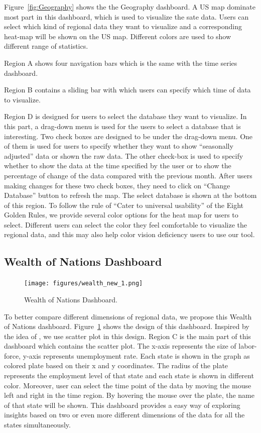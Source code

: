 \documentclass{sigchi}
\begin{document}
Figure~\ref{fig:Geography} shows the the Geography dashboard. A US map dominate most part in this dashboard, which is used to visualize the sate data. Users can select which kind of regional data they want to visualize and a corresponding heat-map will be shown on the US map. Different colors are used to show different range of statistics.

Region A shows four navigation bars which is the same with the time series dashboard.

Region B contains a sliding bar with which users can specify which time of data to visualize.

Region D is designed for users to select the database they want to visualize. In this part, a drag-down menu is used for the users to select a database that is interesting. Two check boxes are designed to be under the drag-down menu. One of them is used for users to specify whether they want to show ``seasonally adjusted'' data or shown the raw data. The other check-box is used to specify whether to show the data at the time specified by the user or to show the percentage of change of the data compared with the previous month. After users making changes for these two check boxes, they need to click on ``Change Database'' button to refresh the map. The select database is shown at the bottom of this region. To follow the rule of ``Cater to universal usability'' of the Eight Golden Rules\cite{eight}, we provide several color options for the heat map for users to select. Different users can select the color they feel comfortable to visualize the regional data, and this may also help
color vision deficiency users to use our tool.


\subsection{Wealth of Nations Dashboard}
\begin{figure}
\centering
\texttt{[image: figures/wealth\_new\_1.png]}
\caption{Wealth of Nations Dashboard.}
\label{fig:wealth}
\end{figure}

To better compare different dimensions of regional data, we propose this Wealth of Nations dashboard. Figure~\ref{fig:wealth} shows the design of this dashboard. Inspired by the idea of \cite{wealth}, we use scatter plot in this design.
Region C is the main part of this dashboard which contains the scatter plot. The x-axis represents the size of labor-force, y-axis represents unemployment rate. Each state is shown in the graph as colored plate based on their x and y coordinates. The radius of the plate represents the employment level of that state and each state is shown in different color. Moreover, user can select the time point of the data by moving the mouse left and right in the time region. By hovering the mouse over the plate, the name of that state will be shown. This dashboard provides a easy way of exploring insights based on two or even more different dimensions of the data for all the states simultaneously.
\end{document}

